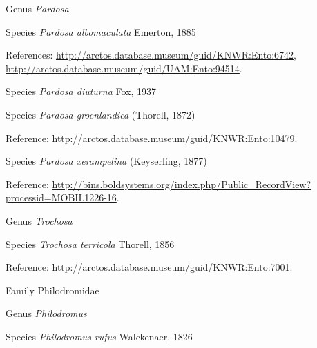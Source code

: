 \documentclass[9pt, article]{memoir}
\begin{document}
\begin{multicols}{2}
\vspace{6pt}\noindent\hspace{30pt}Genus \textit{Pardosa}


\vspace{6pt}\noindent\hspace{36pt}Species \textit{Pardosa albomaculata} Emerton, 1885


\vspace{6pt}References: 
\url{http://arctos.database.museum/guid/KNWR:Ento:6742}, 
\url{http://arctos.database.museum/guid/UAM:Ento:94514}.

\vspace{6pt}\noindent\hspace{36pt}Species \textit{Pardosa diuturna} Fox, 1937


\vspace{6pt}\noindent\hspace{36pt}Species \textit{Pardosa groenlandica} (Thorell, 1872)


\vspace{6pt}Reference: 
\url{http://arctos.database.museum/guid/KNWR:Ento:10479}.

\vspace{6pt}\noindent\hspace{36pt}Species \textit{Pardosa xerampelina} (Keyserling, 1877)


\vspace{6pt}Reference: 
\url{http://bins.boldsystems.org/index.php/Public_RecordView?processid=MOBIL1226-16}.

\vspace{6pt}\noindent\hspace{30pt}Genus \textit{Trochosa}


\vspace{6pt}\noindent\hspace{36pt}Species \textit{Trochosa terricola} Thorell, 1856


\vspace{6pt}Reference: 
\url{http://arctos.database.museum/guid/KNWR:Ento:7001}.

\vspace{6pt}\noindent\hspace{24pt}Family Philodromidae


\vspace{6pt}\noindent\hspace{30pt}Genus \textit{Philodromus}


\vspace{6pt}\noindent\hspace{36pt}Species \textit{Philodromus rufus} Walckenaer, 1826



\end{multicols}
\end{document}
